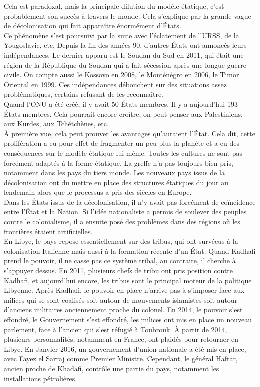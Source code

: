 \documentclass[10pt, a4paper, openany]{book}
\begin{document}
Cela est paradoxal, mais la principale dilution du modèle étatique, c'est probablement son succès à travers le monde. Cela s'explique par la grande vague de décolonisation qui fait apparaître énormément d'États. \\
Ce phénomène s'est poursuivi par la suite avec l'éclatement de l'URSS, de la Yougoslavie, etc. Depuis la fin des années 90, d'autres États ont annoncés leurs indépendances. Le dernier apparu est le Soudan du Sud en 2011, qui était une région de la République du Soudan qui a fait sécession après une longue guerre civile. On compte aussi le Kossovo en 2008, le Monténégro en 2006, le Timor Oriental en 1999. Ces indépendances débouchent sur des situations assez problématiques, certains refusant de les reconnaître. \\
Quand l'ONU a été créé, il y avait 50 États membres. Il y a aujourd'hui 193 États membres. Cela pourrait encore croître, on peut penser aux Palestiniens, aux Kurdes, aux Tchétchènes, etc. \\
À première vue, cela peut prouver les avantages qu'auraient l'État. Cela dit, cette prolifération a eu pour effet de fragmenter un peu plus la planète et a eu des conséquences sur le modèle étatique lui même. Toutes les cultures ne sont pas forcément adaptés à la forme étatique. La greffe n'a pas toujours bien pris, notamment dans les pays du tiers monde. Les nouveaux pays issus de la décolonisation ont du mettre en place des structures étatiques du jour au lendemain alors que le processus a pris des siècles en Europe. \\
Dans les États issus de la décolonisation, il n'y avait pas forcément de coïncidence entre l'État et la Nation. Si l'idée nationaliste a permis de soulever des peuples contre le colonialisme, il a ensuite posé des problèmes dans des régions où les frontières étaient artificielles. \\
En Libye, le pays repose essentiellement sur des tribus, qui ont survécus à la colonisation Italienne mais aussi à la formation récente d'un État. Quand Kadhafi prend le pouvoir, il ne casse pas ce système tribal, au contraire, il cherche à s'appuyer dessus. En 2011, plusieurs chefs de tribu ont pris position contre Kadhafi, et aujourd'hui encore, les tribus sont le principal moteur de la politique Libyenne. Après Kadhafi, le pouvoir en place n'arrive pas à s'imposer face aux milices qui se sont coalisés soit autour de mouvements islamistes soit autour d'anciens militaires anciennement proche du colonel. En 2014, le pouvoir s'est effondré, le Gouvernement s'est effondré, les milices ont mis en place un nouveau parlement, face à l'ancien qui s'est réfugié à Toubrouk. À partir de 2014, plusieurs personnalités, notamment en France, ont plaidés pour retourner en Libye. En Janvier 2016, un gouvernement d'union nationale a été mis en place, avec Fayez el Sarraj comme Premier Ministre. Cependant, le général Haftar, ancien proche de Khadafi, contrôle une partie du pays, notamment les installations pétrolières. 
\end{document}

